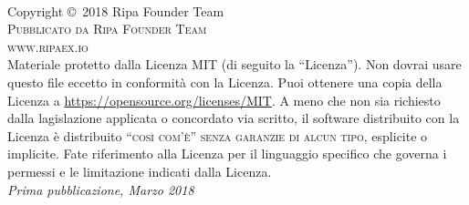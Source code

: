 \documentclass[11pt,fleqn,oneside]{book} %
\begin{document}


\nocite{*}
\printbibliography[title={References}]



\newpage
~\vfill
\thispagestyle{empty}

\noindent Copyright \copyright\ 2018 Ripa Founder Team\\ %

\noindent \textsc{Pubblicato da Ripa Founder Team}\\ %

\noindent \textsc{www.ripaex.io}\\ %

\noindent Materiale protetto dalla Licenza MIT (di seguito la ``Licenza''). Non dovrai usare questo file eccetto in conformità con la Licenza. Puoi ottenere una copia della Licenza a \url{https://opensource.org/licenses/MIT}. A meno che non sia richiesto dalla lagislazione applicata o concordato via scritto, il software distribuito con la Licenza è distribuito \textsc{``così com'è'' senza garanzie di alcun tipo}, esplicite o implicite. Fate riferimento alla Licenza per il linguaggio specifico che governa i permessi e le limitazione indicati dalla Licenza.\\ 

\noindent \textit{Prima pubblicazione, Marzo 2018} %
\end{document}
